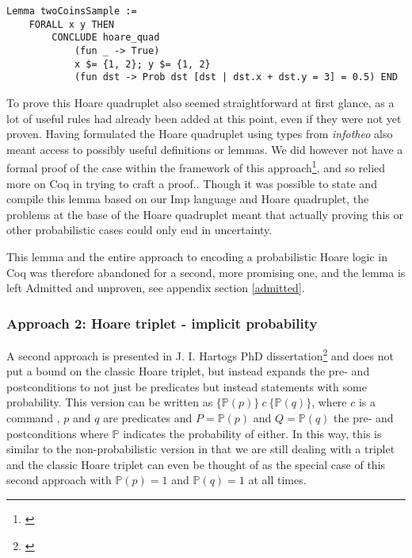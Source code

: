 \begin{verbatim}
Lemma twoCoinsSample :=
    FORALL x y THEN
        CONCLUDE hoare_quad
            (fun _ -> True)
            x $= {1, 2}; y $= {1, 2}
            (fun dst -> Prob dst [dst | dst.x + dst.y = 3] = 0.5) END
\end{verbatim}

To prove this Hoare quadruplet also seemed straightforward at first glance, as a lot of useful rules had already been added at this point, even if they were not yet proven. Having formulated the Hoare quadruplet using types from \textit{infotheo} also meant access to possibly useful definitions or lemmas. We did however not have a formal proof of the case within the framework of this approach\footnote{\textcite{HoareSlides}}, and so relied more on Coq in trying to craft a proof.. %
Though it was possible to state and compile this lemma based on our Imp language and Hoare quadruplet, the problems at the base of the Hoare quadruplet meant that actually proving this or other probabilistic cases could only end in uncertainty.

This lemma and the entire approach to encoding a probabilistic Hoare logic in Coq was therefore abandoned for a second, more promising one, and the lemma is left Admitted and unproven, see appendix section \ref{admitted}. 


\subsubsection{Approach 2: Hoare triplet - implicit probability}\label{meatApp2}
 \label{meatApp2Theory}
A second approach is presented in J. I. Hartogs PhD dissertation\footnote{\textcite{PHdProbExtensions}} and does not put a bound on the classic Hoare triplet, but instead expands the pre- and postconditions to not just be predicates but instead statements with some probability. This version can be written as $\{\mathbb{P}(p)\}\ c\ \{\mathbb{P}(q)\}$, where $c$ is a command
, $p$ and $q$ are predicates and $P=\mathbb{P}(p)$ and $Q=\mathbb{P}(q)$ the pre- and postconditions where $\mathbb{P}$ indicates the probability of either. In this way, this is similar to the non-probabilistic version in that we are still dealing with a triplet and the classic Hoare triplet can even be thought of as the special case of this second approach with $\mathbb{P}(p) = 1$ and $\mathbb{P}(q)=1$ at all times. 

